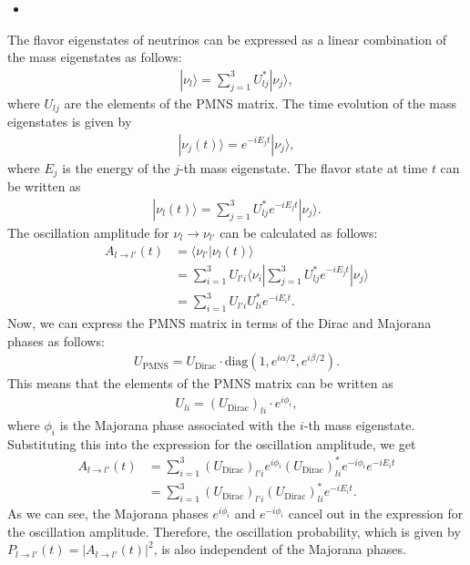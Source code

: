 \answer{}
\begin{itemize}
    \item [(a)]
\end{itemize}
The flavor eigenstates of neutrinos can be expressed as a linear combination of the mass eigenstates as follows:
\begin{align}
    |\nu_l\rangle = \sum_{j=1}^3 U_{lj}^* |\nu_j\rangle,
\end{align}where $U_{lj}$ are the elements of the PMNS matrix. The time evolution of the mass eigenstates is given by
\begin{align}
    |\nu_j(t)\rangle = e^{-i E_j t} |\nu_j\rangle,
\end{align}where $E_j$ is the energy of the $j$-th mass eigenstate. The flavor state at time $t$ can be written as
\begin{align}
    |\nu_l(t)\rangle = \sum_{j=1}^3 U_{lj}^* e^{-i E_j t} |\nu_j\rangle.
\end{align} 
The oscillation amplitude for $\nu_l \to \nu_{l'}$ can be calculated as follows:
\begin{align}
    A_{l \to l'}(t) &= \langle \nu_{l'} | \nu_l(t) \rangle \\
    &= \sum_{i=1}^3 U_{l'i} \langle \nu_i | \sum_{j=1}^3 U_{lj}^* e^{-i E_j t} |\nu_j\rangle \\
    &= \sum_{i=1}^3 U_{l'i} U_{li}^* e^{-i E_i t}.
\end{align}
Now, we can express the PMNS matrix in terms of the Dirac and Majorana phases as follows:
\begin{align}
    U_\text{PMNS} = U_\text{Dirac} \cdot \text{diag}(1, e^{i\alpha/2}, e^{i\beta/2}).
\end{align}
This means that the elements of the PMNS matrix can be written as
\begin{align}
    U_{li} = (U_\text{Dirac})_{li} \cdot e^{i\phi_i},
\end{align}where $\phi_i$ is the Majorana phase associated with the $i$-th mass eigenstate. Substituting this into the expression for the oscillation amplitude, we get
\begin{align}
    A_{l \to l'}(t) &= \sum_{i=1}^3 (U_\text{Dirac})_{l'i} e^{i\phi_i} (U_\text{Dirac})_{li}^* e^{-i\phi_i} e^{-i E_i t} \\
    &= \sum_{i=1}^3 (U_\text{Dirac})_{l'i} (U_\text{Dirac})_{li}^* e^{-i E_i t}.
\end{align}
As we can see, the Majorana phases $e^{i\phi_i}$ and $e^{-i\phi_i}$ cancel out in the expression for the oscillation amplitude. Therefore, the oscillation probability, which is given by $P_{l \to l'}(t) = |A_{l \to l'}(t)|^2$, is also independent of the Majorana phases.

